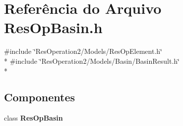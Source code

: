 \section{Referência do Arquivo Res\+Op\+Basin.\+h}
\label{_res_op_basin_8h}
{\ttfamily \#include \char`\"{}Res\+Operation2/\+Models/\+Res\+Op\+Element.\+h\char`\"{}}\\*
{\ttfamily \#include \char`\"{}Res\+Operation2/\+Models/\+Basin/\+Basin\+Result.\+h\char`\"{}}\\*
\subsection*{Componentes}
\begin{DoxyCompactItemize}
\item 
class {\bf Res\+Op\+Basin}
\end{DoxyCompactItemize}
